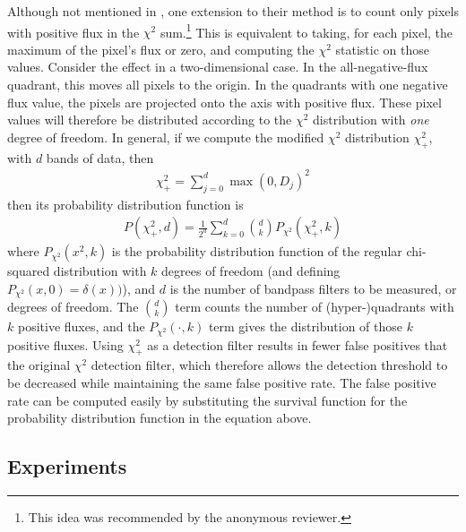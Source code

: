 \documentclass[11pt,letterpaper,linenumbers]{aastex63}
\newcommand{\chipos}{\chi_+}
\begin{document}
Although not mentioned in \cite{szalay1999}, one extension to their
method is to count only pixels with positive flux in the $\chi^2$
sum.\footnote{This idea was recommended by the anonymous reviewer.}
This is equivalent to taking, for each pixel, the maximum of the
pixel's flux or zero, and computing the $\chi^2$ statistic on those
values.  Consider the effect in a two-dimensional case.  In the
all-negative-flux quadrant, this moves all pixels to the origin.  In
the quadrants with one negative flux value, the pixels are projected
onto the axis with positive flux.  These pixel values will therefore
be distributed according to the $\chi^2$ distribution with \emph{one}
degree of freedom.  In general, if we compute the modified $\chi^2$
distribution $\chipos^2$, with $d$ bands of data, then
\begin{eqnarray}
  \chipos^2 = \sum_{j=0}^d \max(0, D_j)^2
  \label{eqn:chipos}
\end{eqnarray}
then its probability distribution function is
\begin{eqnarray}
P(\chipos^2, d) = \frac{1}{2^d} \sum_{k=0}^d \binom{d}{k} P_{\chi^2}(\chipos^2, k)
\end{eqnarray}
where $P_{\chi^2}(x^2, k)$ is the probability distribution function of
the regular chi-squared distribution with $k$ degrees of freedom (and defining
$P_{\chi^2}(x, 0) = \delta(x))$), and $d$ is the number of bandpass
filters to be measured, or degrees of freedom.  The
$\binom{d}{k}$ term counts the number of (hyper-)quadrants with
$k$ positive fluxes, and the $P_{\chi^2}(\cdot, k)$ term gives the distribution
of those $k$ positive fluxes.  Using $\chipos^2$ as a detection filter
results in fewer false positives that the original $\chi^2$ detection
filter, which therefore allows the detection threshold to be decreased
while maintaining the same false positive rate.  The false positive
rate can be computed easily by substituting the survival function for
the probability distribution function in the equation above.

\subsection{Experiments}
\end{document}
